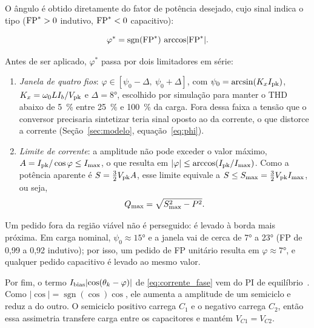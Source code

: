 O ângulo é obtido diretamente do fator de potência desejado, cujo sinal
indica o tipo ($\mathrm{FP}^*>0$ indutivo, $\mathrm{FP}^*<0$ capacitivo):

\begin{equation}
    \varphi^* = \operatorname{sgn}(\mathrm{FP}^*)\,\arccos\lvert \mathrm{FP}^*\rvert .
    \label{eq:phi_ref}
\end{equation}

Antes de ser aplicado, $\varphi^*$ passa por dois limitadores em série:
\begin{enumerate}
    \item \textit{Janela de quatro fios}: $\varphi\in[\psi_0-\Delta,\ \psi_0+\Delta]$,
    com $\psi_0=\arcsin(K_xI_{\mathrm{pk}})$, $K_x=\omega_0LI_b/V_{\mathrm{pk}}$ e $\Delta=\ang{8}$, escolhido por simulação para
    manter o THD abaixo de \SI{5}{\percent} entre \SI{25}{\percent} e \SI{100}{\percent} da carga.
    Fora dessa faixa a tensão que o conversor precisaria sintetizar teria sinal
    oposto ao da corrente, o que distorce a corrente
    (Seção~\ref{sec:modelo}, equação~\eqref{eq:phi}).

    \item \textit{Limite de corrente}: a amplitude não pode exceder o valor
    máximo, $A=I_{\mathrm{pk}}/\cos\varphi\le I_{\mathrm{max}}$, o que resulta em
    $\lvert\varphi\rvert\le\arccos(I_{\mathrm{pk}}/I_{\mathrm{max}})$. Como a potência aparente é $S = \tfrac{3}{2}V_{\mathrm{pk}}A$, esse limite equivale a
    $S \le S_{\mathrm{max}} = \tfrac{3}{2}V_{\mathrm{pk}}I_{\mathrm{max}}$, ou seja,
    \begin{equation}
        Q_{\mathrm{max}} = \sqrt{S_{\mathrm{max}}^2 - P^2}.
        \label{eq:qmax}
    \end{equation}
\end{enumerate}

Um pedido fora da região viável não é perseguido: é levado à borda mais próxima. Em
carga nominal, $\psi_0\approx\ang{15}$ e a janela vai de cerca de \ang{7} a \ang{23}
(FP de 0,99 a 0,92 indutivo); por isso, um pedido de FP unitário resulta em
$\varphi\approx\ang{7}$, e qualquer pedido capacitivo é levado ao mesmo valor.

Por fim, o termo $I_{\mathrm{bias}}\lvert\cos(\theta_k-\varphi)\rvert$ de
\eqref{eq:corrente_fase} vem do PI de equilíbrio~\cite{alahuhtala2006fourwire}. Como
$\lvert\cos\rvert=\operatorname{sgn}(\cos)\cos$, ele aumenta a amplitude de um
semiciclo e reduz a do outro. O semiciclo positivo carrega $C_1$ e o negativo
carrega $C_2$, então essa assimetria transfere carga entre os capacitores e
mantém $V_{C1}=V_{C2}$.


